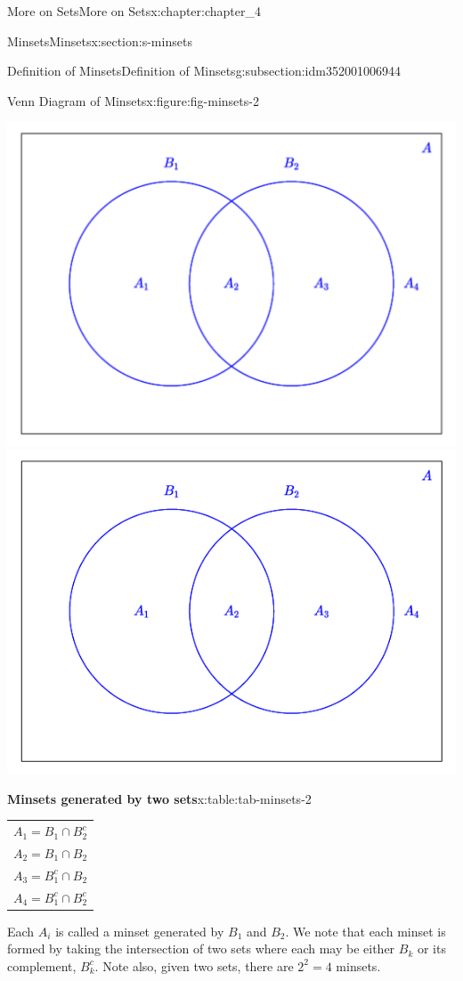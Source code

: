 \documentclass[oneside,10pt,]{book}
\newcommand{\tabularfont}{\relax}
\begin{document}
\begin{chapterptx}{More on Sets}{}{More on Sets}{}{}{x:chapter:chapter_4}
\begin{sectionptx}{Minsets}{}{Minsets}{}{}{x:section:s-minsets}
\begin{subsectionptx}{Definition of Minsets}{}{Definition of Minsets}{}{}{g:subsection:idm352001006944}
\begin{figureptx}{Venn Diagram of Minsets}{x:figure:fig-minsets-2}{}
\begin{image}{0.165}{0.67}{0.165}
{\includegraphics[width=\linewidth]{images/minsets-2.pdf}}%
{\includegraphics[width=\linewidth]{images/minsets-2.png}}
\end{image}%
\tcblower
\end{figureptx}%
\begin{tableptx}{\textbf{Minsets generated by two sets}}{x:table:tab-minsets-2}{}%
\centering
{\tabularfont%
\begin{tabular}{c}
\(A_1=B_1\cap B_2^c\)\tabularnewline[0pt]
\(A_2=B_1\cap B_2\)\tabularnewline[0pt]
\(A_3= B_1^c\cap B_2\)\tabularnewline[0pt]
\(A_4= B_1^c\cap B_2^c\)
\end{tabular}
}%
\end{tableptx}%
Each \(A_i\) is called a minset generated by \(B_1\) and \(B_2\). We note that each minset is formed by taking the intersection of two sets where each may be either \(B_k\) or its complement, \(B_k^c\). Note also, given two sets, there are \(2^{2}=4\) minsets.%

\end{subsectionptx}
\end{sectionptx}
\end{chapterptx}
\end{document}
